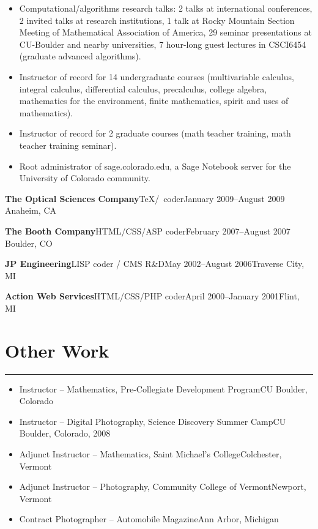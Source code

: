 \documentclass[letterpaper,10pt]{article}
\newcommand{\mblue}{\color{darkblue}}
\begin{document}
\begin{itemize}
\item Computational/algorithms research talks: 2 talks at international conferences, 2 invited talks
at research institutions, 1 talk at Rocky Mountain Section Meeting of Mathematical Association of
America, 29 seminar presentations at CU-Boulder and nearby universities, 7 hour-long guest lectures
in CSCI6454 (graduate advanced algorithms).

\item Instructor of record for 14 undergraduate courses (multivariable calculus,
integral calculus, differential calculus, precalculus, college algebra, mathematics for the
environment, finite mathematics, spirit and uses of mathematics).

\item Instructor of record for 2
graduate courses (math teacher training, math teacher training seminar).

\item Root administrator
of sage.colorado.edu, a Sage Notebook server for the University of Colorado community.
\end{itemize} 

\vspace{1pc}
\textbf{The Optical Sciences Company}\quad\TeX/\LaTeXe\ coder\quad January 2009--August 2009
\hfill Anaheim, CA

\vspace{1pc}
\textbf{The Booth Company}\quad HTML/CSS/ASP coder\quad February 2007--August 2007
\hfill Boulder, CO

\vspace{1pc}
\textbf{JP Engineering}\quad LISP coder / CMS R\&D\quad May 2002--August 2006\hfill Traverse City, MI

\vspace{1pc}
\textbf{Action Web Services}\quad HTML/CSS/PHP coder\quad April 2000--January 2001\hfill Flint, MI

\section*{\mblue Other Work}

\vspace{-2.15pc}
{\hfill\mblue\rule{5.7in}{0.02cm}}

\vspace{1pc}
\begin{itemize}
\item Instructor -- Mathematics, Pre-Collegiate Development Program\hfill CU Boulder, Colorado
\item Instructor -- Digital Photography, Science Discovery Summer Camp\hfill CU Boulder,
Colorado, 2008
\item Adjunct Instructor -- Mathematics, Saint Michael's College\hfill Colchester, Vermont
\item Adjunct Instructor -- Photography, Community College of Vermont\hfill Newport, Vermont
\item Contract Photographer -- Automobile Magazine\hfill Ann Arbor, Michigan
\end{itemize}
\end{document}

